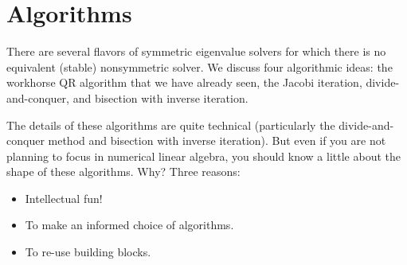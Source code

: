 \section{Algorithms}

There are several flavors of symmetric eigenvalue solvers for which
there is no equivalent (stable) nonsymmetric solver.  We discuss four
algorithmic ideas: the workhorse QR algorithm that we have already
seen, the Jacobi iteration, divide-and-conquer, and bisection with
inverse iteration.

The details of these algorithms are quite technical (particularly
the divide-and-conquer method and bisection with inverse iteration).
But even if you are not planning to focus in numerical linear algebra,
you should know a little about the shape of these algorithms.  Why?
Three reasons:
\begin{itemize}
\item Intellectual fun!
\item To make an informed choice of algorithms.
\item To re-use building blocks.
\end{itemize}

